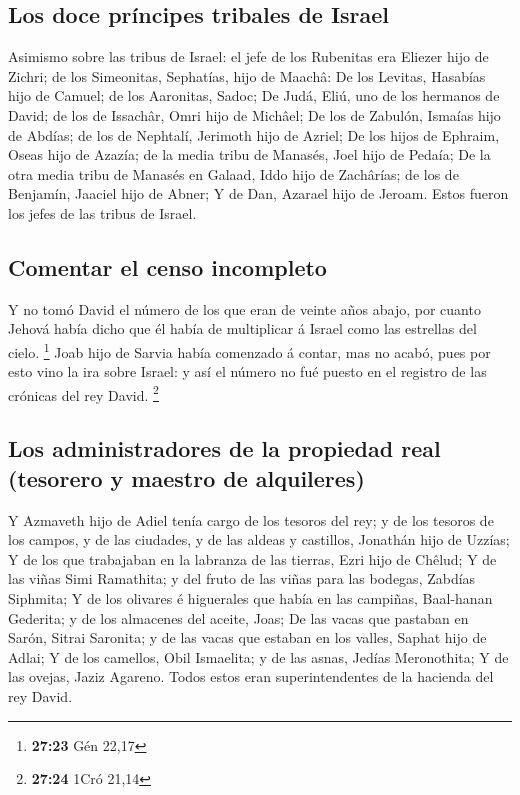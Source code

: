 \hypertarget{los-doce-pruxedncipes-tribales-de-israel}{%
\subsection{Los doce príncipes tribales de
Israel}\label{los-doce-pruxedncipes-tribales-de-israel}}

 Asimismo sobre las tribus de Israel: el jefe de los
Rubenitas era Eliezer hijo de Zichri; de los Simeonitas, Sephatías, hijo
de Maachâ:  De los Levitas, Hasabías hijo de Camuel; de los
Aaronitas, Sadoc;  De Judá, Eliú, uno de los hermanos de
David; de los de Issachâr, Omri hijo de Michâel;  De los de
Zabulón, Ismaías hijo de Abdías; de los de Nephtalí, Jerimoth hijo de
Azriel;  De los hijos de Ephraim, Oseas hijo de Azazía; de
la media tribu de Manasés, Joel hijo de Pedaía;  De la otra
media tribu de Manasés en Galaad, Iddo hijo de Zachârías; de los de
Benjamín, Jaaciel hijo de Abner;  Y de Dan, Azarael hijo de
Jeroam. Estos fueron los jefes de las tribus de Israel.

\hypertarget{comentar-el-censo-incompleto}{%
\subsection{Comentar el censo
incompleto}\label{comentar-el-censo-incompleto}}

 Y no tomó David el número de los que eran de veinte años
abajo, por cuanto Jehová había dicho que él había de multiplicar á
Israel como las estrellas del cielo. \footnote{\textbf{27:23} Gén 22,17}
 Joab hijo de Sarvia había comenzado á contar, mas no
acabó, pues por esto vino la ira sobre Israel: y así el número no fué
puesto en el registro de las crónicas del rey David. \footnote{\textbf{27:24}
  1Cró 21,14}

\hypertarget{los-administradores-de-la-propiedad-real-tesorero-y-maestro-de-alquileres}{%
\subsection{Los administradores de la propiedad real (tesorero y maestro
de
alquileres)}\label{los-administradores-de-la-propiedad-real-tesorero-y-maestro-de-alquileres}}

 Y Azmaveth hijo de Adiel tenía cargo de los tesoros del
rey; y de los tesoros de los campos, y de las ciudades, y de las aldeas
y castillos, Jonathán hijo de Uzzías;  Y de los que
trabajaban en la labranza de las tierras, Ezri hijo de Chêlud;
 Y de las viñas Simi Ramathita; y del fruto de las viñas
para las bodegas, Zabdías Siphmita;  Y de los olivares é
higuerales que había en las campiñas, Baal-hanan Gederita; y de los
almacenes del aceite, Joas;  De las vacas que pastaban en
Sarón, Sitrai Saronita; y de las vacas que estaban en los valles, Saphat
hijo de Adlai;  Y de los camellos, Obil Ismaelita; y de las
asnas, Jedías Meronothita;  Y de las ovejas, Jaziz Agareno.
Todos estos eran superintendentes de la hacienda del rey David.

